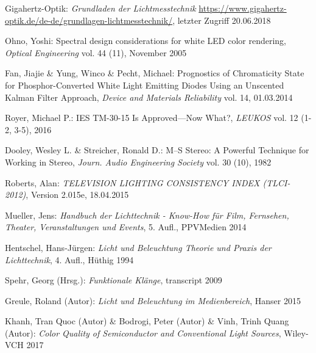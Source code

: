\begin{thebibliography}{}
Gigahertz-Optik:
\emph{\glqq Grundladen der Lichtmesstechnik\grqq}
\url{https://www.gigahertz-optik.de/de-de/grundlagen-lichtmesstechnik/}, letzter Zugriff 20.06.2018



Ohno, Yoshi:
\glqq Spectral design considerations for white LED color rendering\grqq, 
\emph{Optical Engineering} vol. 44 (11), November 2005


Fan, Jiajie \& Yung, Winco \& Pecht, Michael:
\glqq Prognostics of Chromaticity State for Phosphor-Converted White Light Emitting Diodes Using an Unscented Kalman Filter Approach\grqq, 
\emph{Device and Materials Reliability} vol. 14, 01.03.2014

Royer, Michael P.:
\glqq IES TM-30-15 Is Approved—Now What?\grqq, 
\emph{LEUKOS} vol. 12 (1-2, 3-5), 2016


Dooley, Wesley L.  \& Streicher, Ronald D.:
\glqq M--S Stereo: A Powerful Technique for Working in Stereo\grqq, 
\emph{Journ. Audio Engineering Society} vol. 30 (10), 1982

Roberts, Alan: 
\emph{TELEVISION LIGHTING CONSISTENCY INDEX (TLCI-2012)}, Version 2.015e, 18.04.2015

Mueller, Jens: 
\emph{Handbuch der Lichttechnik - Know-How für Film, Fernsehen, Theater, Veranstaltungen und Events}, 5. Aufl., PPVMedien 2014
 
Hentschel, Hans-Jürgen: 
\emph{Licht und Beleuchtung Theorie und Praxis der Lichttechnik}, 4. Aufl., Hüthig 1994

Spehr, Georg (Hrsg.): 
\emph{Funktionale Klänge}, transcript 2009

Greule, Roland (Autor):
\emph{Licht und Beleuchtung im Medienbereich}, Hanser 2015 

Khanh, Tran Quoc (Autor) \& Bodrogi, Peter (Autor) \& Vinh, Trinh Quang (Autor):
\emph{Color Quality of Semiconductor and Conventional Light Sources}, Wiley-VCH 2017



\end{thebibliography}
